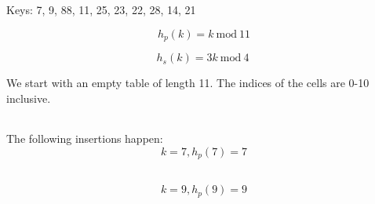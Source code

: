 \section{}
Keys: 7, 9, 88, 11, 25, 23, 22, 28, 14, 21

\[h_p\left(k\right)=k\mathrm{\ mod\ }11 \]

\[h_s\left(k\right)=3k\mathrm{\ mod\ }4\ \]

We start with an empty table of length 11. The indices of the cells are 0-10 inclusive.

\begin{tabularx}{\textwidth} {
        | >{\centering\arraybackslash}X
        | >{\centering\arraybackslash}X
        | >{\centering\arraybackslash}X
        | >{\centering\arraybackslash}X
        | >{\centering\arraybackslash}X
        | >{\centering\arraybackslash}X
        | >{\centering\arraybackslash}X
        | >{\centering\arraybackslash}X
        | >{\centering\arraybackslash}X
        | >{\centering\arraybackslash}X
        | >{\centering\arraybackslash}X |}
    \hline
     &  &  &  &  &  &  &  &  &  & \\
    \hline
\end{tabularx}

The following insertions happen:
\[k=7,h_p\left(7\right)=7 \]

\begin{tabularx}{\textwidth} {
        | >{\centering\arraybackslash}X
        | >{\centering\arraybackslash}X
        | >{\centering\arraybackslash}X
        | >{\centering\arraybackslash}X
        | >{\centering\arraybackslash}X
        | >{\centering\arraybackslash}X
        | >{\centering\arraybackslash}X
        | >{\centering\arraybackslash}X
        | >{\centering\arraybackslash}X
        | >{\centering\arraybackslash}X
        | >{\centering\arraybackslash}X |}
    \hline
     &  &  &  &  &  &  & 7 &  &  & \\
    \hline
\end{tabularx}

\[k=9,h_p\left(9\right)=9 \]

\begin{tabularx}{\textwidth} {
        | >{\centering\arraybackslash}X
        | >{\centering\arraybackslash}X
        | >{\centering\arraybackslash}X
        | >{\centering\arraybackslash}X
        | >{\centering\arraybackslash}X
        | >{\centering\arraybackslash}X
        | >{\centering\arraybackslash}X
        | >{\centering\arraybackslash}X
        | >{\centering\arraybackslash}X
        | >{\centering\arraybackslash}X
        | >{\centering\arraybackslash}X |}
    \hline
     &  &  &  &  &  &  & 7 &  & 9 & \\
    \hline
\end{tabularx}

